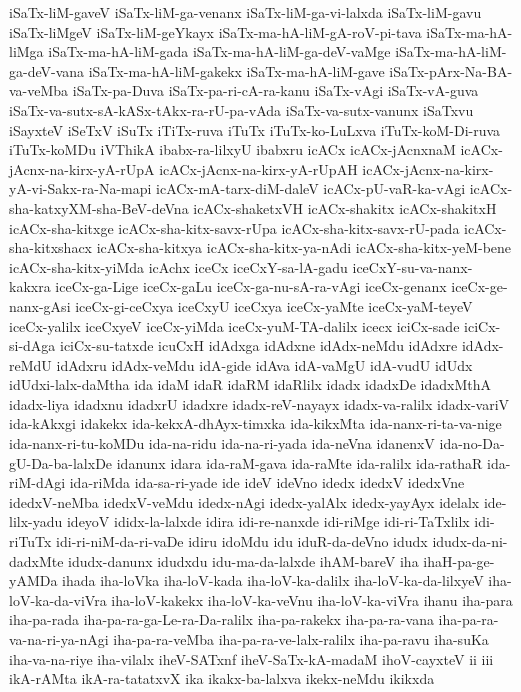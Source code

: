 {iSaTx-liM-gaveV
iSaTx-liM-ga-venanx
iSaTx-liM-ga-vi-lalxda
iSaTx-liM-gavu
iSaTx-liMgeV
iSaTx-liM-geYkayx
iSaTx-ma-hA-liM-gA-roV-pi-tava
iSaTx-ma-hA-liMga
iSaTx-ma-hA-liM-gada
iSaTx-ma-hA-liM-ga-deV-vaMge
iSaTx-ma-hA-liM-ga-deV-vana
iSaTx-ma-hA-liM-gakekx
iSaTx-ma-hA-liM-gave
iSaTx-pArx-Na-BA-va-veMba
iSaTx-pa-Duva
iSaTx-pa-ri-cA-ra-kanu
iSaTx-vAgi
iSaTx-vA-guva
iSaTx-va-sutx-sA-kASx-tAkx-ra-rU-pa-vAda
iSaTx-va-sutx-vanunx
iSaTxvu
iSayxteV
iSeTxV
iSuTx
iTiTx-ruva
iTuTx
iTuTx-ko-LuLxva
iTuTx-koM-Di-ruva
iTuTx-koMDu
iVThikA
ibabx-ra-lilxyU
ibabxru
icACx
icACx-jAcnxnaM
icACx-jAcnx-na-kirx-yA-rUpA
icACx-jAcnx-na-kirx-yA-rUpAH
icACx-jAcnx-na-kirx-yA-vi-Sakx-ra-Na-mapi
icACx-mA-tarx-diM-daleV
icACx-pU-vaR-ka-vAgi
icACx-sha-katxyXM-sha-BeV-deVna
icACx-shaketxVH
icACx-shakitx
icACx-shakitxH
icACx-sha-kitxge
icACx-sha-kitx-savx-rUpa
icACx-sha-kitx-savx-rU-pada
icACx-sha-kitxshacx
icACx-sha-kitxya
icACx-sha-kitx-ya-nAdi
icACx-sha-kitx-yeM-bene
icACx-sha-kitx-yiMda
icAchx
iceCx
iceCxY-sa-lA-gadu
iceCxY-su-va-nanx-kakxra
iceCx-ga-Lige
iceCx-gaLu
iceCx-ga-nu-sA-ra-vAgi
iceCx-genanx
iceCx-ge-nanx-gAsi
iceCx-gi-ceCxya
iceCxyU
iceCxya
iceCx-yaMte
iceCx-yaM-teyeV
iceCx-yalilx
iceCxyeV
iceCx-yiMda
iceCx-yuM-TA-dalilx
icecx
iciCx-sade
iciCx-si-dAga
iciCx-su-tatxde
icuCxH
idAdxga
idAdxne
idAdx-neMdu
idAdxre
idAdx-reMdU
idAdxru
idAdx-veMdu
idA-gide
idAva
idA-vaMgU
idA-vudU
idUdx
idUdxi-lalx-daMtha
ida
idaM
idaR
idaRM
idaRlilx
idadx
idadxDe
idadxMthA
idadx-liya
idadxnu
idadxrU
idadxre
idadx-reV-nayayx
idadx-va-ralilx
idadx-variV
ida-kAkxgi
idakekx
ida-kekxA-dhAyx-timxka
ida-kikxMta
ida-nanx-ri-ta-va-nige
ida-nanx-ri-tu-koMDu
ida-na-ridu
ida-na-ri-yada
ida-neVna
idanenxV
ida-no-Da-gU-Da-ba-lalxDe
idanunx
idara
ida-raM-gava
ida-raMte
ida-ralilx
ida-rathaR
ida-riM-dAgi
ida-riMda
ida-sa-ri-yade
ide
ideV
ideVno
idedx
idedxV
idedxVne
idedxV-neMba
idedxV-veMdu
idedx-nAgi
idedx-yalAlx
idedx-yayAyx
idelalx
ide-lilx-yadu
ideyoV
ididx-la-lalxde
idira
idi-re-nanxde
idi-riMge
idi-ri-TaTxlilx
idi-riTuTx
idi-ri-niM-da-ri-vaDe
idiru
idoMdu
idu
iduR-da-deVno
idudx
idudx-da-ni-dadxMte
idudx-danunx
idudxdu
idu-ma-da-lalxde
ihAM-bareV
iha
ihaH-pa-ge-yAMDa
ihada
iha-loVka
iha-loV-kada
iha-loV-ka-dalilx
iha-loV-ka-da-lilxyeV
iha-loV-ka-da-viVra
iha-loV-kakekx
iha-loV-ka-veVnu
iha-loV-ka-viVra
ihanu
iha-para
iha-pa-rada
iha-pa-ra-ga-Le-ra-Da-ralilx
iha-pa-rakekx
iha-pa-ra-vana
iha-pa-ra-va-na-ri-ya-nAgi
iha-pa-ra-veMba
iha-pa-ra-ve-lalx-ralilx
iha-pa-ravu
iha-suKa
iha-va-na-riye
iha-vilalx
iheV-SATxnf
iheV-SaTx-kA-madaM
ihoV-cayxteV
ii
iii
ikA-rAMta
ikA-ra-tatatxvX
ika
ikakx-ba-lalxva
ikekx-neMdu
ikikxda
}
